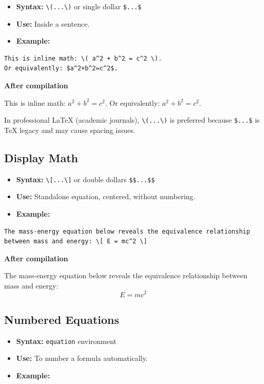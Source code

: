 \documentclass[12pt,a4paper]{article}
\begin{document}
\begin{itemize}
    \item \textbf{Syntax:} \verb|\(...\)| or single dollar \verb|$...$|
    \item \textbf{Use:} Inside a sentence.
    \item \textbf{Example:}
\end{itemize}

\begin{verbatim}
This is inline math: \( a^2 + b^2 = c^2 \).
Or equivalently: $a^2+b^2=c^2$.
\end{verbatim}

\textbf{After compilation}

This is inline math: \( a^2 + b^2 = c^2 \).
Or equivalently: $a^2+b^2=c^2$.

In professional LaTeX (academic journals), \verb|\(...\)| is preferred because \verb|$...$| is TeX legacy and may cause spacing issues.

\subsection{Display Math}

\begin{itemize}
    \item \textbf{Syntax:} \verb|\[...\]| or double dollars \verb|$$...$$|
    \item \textbf{Use:} Standalone equation, centered, without numbering.
    \item \textbf{Example:}
\end{itemize}

\begin{verbatim}
The mass-energy equation below reveals the equivalence relationship
between mass and energy: \[ E = mc^2 \]
\end{verbatim}

\textbf{After compilation}

The mass-energy equation below reveals the equivalence relationship
between mass and energy: \[ E = mc^2 \]

\subsection{Numbered Equations}

\begin{itemize}
    \item \textbf{Syntax:} \texttt{equation} environment
    \item \textbf{Use:} To number a formula automatically.
    \item \textbf{Example:}
\end{itemize}
\end{document}
